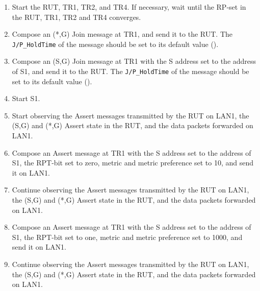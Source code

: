 \documentclass[11pt]{report}
\begin{document}
\begin{enumerate}

  \item Start the RUT, TR1, TR2, and TR4. If necessary, wait until the RP-set
  in the RUT, TR1, TR2 and TR4 converges.

  \item Compose an (*,G) Join message at TR1, and send it to the RUT.
  The \verb=J/P_HoldTime= of the message should be set to its default
  value ({\PimsmJPHoldTime}).

  \item Compose an (S,G) Join message at TR1 with the S address set to the
  address of S1, and send it to the RUT.
  The \verb=J/P_HoldTime= of the message should be set to its default
  value ({\PimsmJPHoldTime}).

  \item Start S1.

  \item Start observing the Assert messages transmitted by the RUT on
  LAN1, the (S,G) and (*,G) Assert state in the RUT, and the data packets
  forwarded on LAN1. 

  \item Compose an Assert message at TR1 with the S address set to the
  address of S1, the RPT-bit set to zero, metric and metric preference set to
  10, and send it on LAN1.

  \item Continue observing the Assert messages transmitted by the RUT on
  LAN1, the (S,G) and (*,G) Assert state in the RUT, and the data packets
  forwarded on LAN1.

  \item Compose an Assert message at TR1 with the S address set to the
  address of S1, the RPT-bit set to one, metric and metric preference set to
  1000, and send it on LAN1.

  \item Continue observing the Assert messages transmitted by the RUT on
  LAN1, the (S,G) and (*,G) Assert state in the RUT, and the data packets
  forwarded on LAN1.

\end{enumerate}

\end{document}
